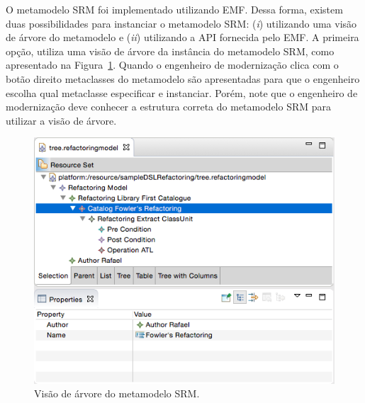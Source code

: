 O metamodelo SRM foi implementado utilizando EMF. Dessa forma, existem duas possibilidades para instanciar o metamodelo SRM: (\textit{i}) utilizando uma visão de árvore do metamodelo e (\textit{ii}) utilizando a API fornecida pelo EMF. A primeira opção, utiliza uma visão de árvore da instância do metamodelo SRM, como apresentado na Figura~\ref{fig:visao_arvore_metamodelo_srm}. Quando o engenheiro de modernização clica com o botão direito metaclasses do metamodelo são apresentadas para que o engenheiro escolha qual metaclasse especificar e instanciar. Porém, note que o engenheiro de modernização deve conhecer a estrutura correta do metamodelo SRM para utilizar a visão de árvore. 

\begin{figure}[h]
	\centering
	\caption{Visão de árvore do metamodelo SRM.}
	\label{fig:visao_arvore_metamodelo_srm}
	\includegraphics[scale=0.65]{images/tree_srm}
	\fautor
\end{figure}


